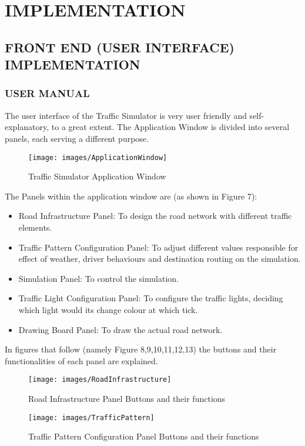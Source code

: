 \documentclass[11pt,a4paper]{article}
\begin{document}
\section{IMPLEMENTATION}
  \subsection{FRONT END (USER INTERFACE) IMPLEMENTATION}
	\subsubsection{USER MANUAL}
	The user interface of the Traffic Simulator is very user friendly
	and self-explanatory, to a great extent. The Application Window is divided into several panels, each serving
	a different purpose.
		\begin{figure}[h]
			\texttt{[image: images/ApplicationWindow]}
			\caption{Traffic Simulator Application Window}
			\centering
		\end{figure}
	The Panels within the application window are (as shown in Figure 7):
	\begin{itemize}
	\setlength\itemsep{0.3em}
		\item Road Infrastructure Panel: To design the road network with different traffic elements.
		\item Traffic Pattern Configuration Panel: To adjust different values responsible for effect of weather, driver behaviours and destination routing on the simulation.
		\item Simulation Panel: To control the simulation.
		\item Traffic Light Configuration Panel: To configure the traffic lights, deciding which light would its change colour at which tick.
		\item Drawing Board Panel: To draw the actual road network.
	\end{itemize}
	In figures that follow (namely Figure 8,9,10,11,12,13) the buttons and their functionalities of each panel are explained.
	
	\begin{figure}[bp!]
		\texttt{[image: images/RoadInfrastructure]}
		\caption{Road Infrastructure Panel Buttons and their functions}
		\centering
	\end{figure}
	
	\begin{figure}[bp!]
		\texttt{[image: images/TrafficPattern]}
		\caption{Traffic Pattern Configuration Panel Buttons and their functions}
		\centering
	\end{figure}
	
\end{document}
